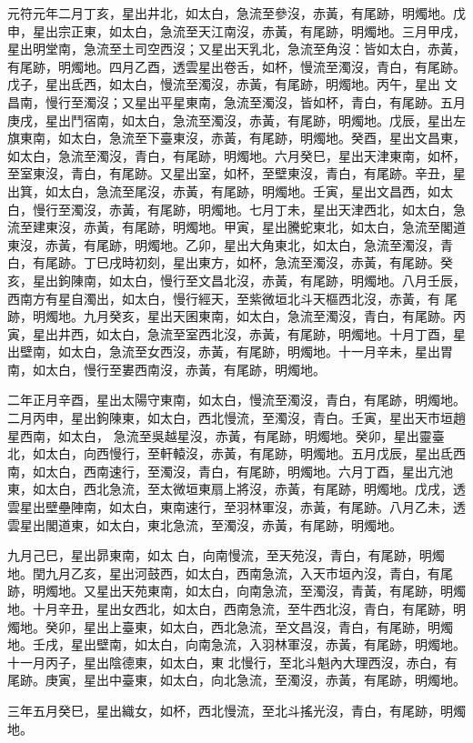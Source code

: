 \begin{pinyinscope}
 元符元年二月丁亥，星出井北，如太白，急流至參沒，赤黃，有尾跡，明燭地。戊申，星出宗正東，如太白，急流至天江南沒，赤黃，有尾跡，明燭地。三月甲戌，星出明堂南，急流至土司空西沒；又星出天乳北，急流至角沒：皆如太白，赤黃，有尾跡，明燭地。四月乙酉，透雲星出卷舌，如杯，慢流至濁沒，青白，有尾跡。戊子，星出氐西，如太白，慢流至濁沒，赤黃，有尾跡，明燭地。丙午，星出
 文昌南，慢行至濁沒；又星出平星東南，急流至濁沒，皆如杯，青白，有尾跡。五月庚戌，星出鬥宿南，如太白，急流至濁沒，赤黃，有尾跡，明燭地。戊辰，星出左旗東南，如太白，急流至下臺東沒，赤黃，有尾跡，明燭地。癸酉，星出文昌東，如太白，急流至濁沒，青白，有尾跡，明燭地。六月癸巳，星出天津東南，如杯，至室東沒，青白，有尾跡。又星出室，如杯，至壁東沒，青白，有尾跡。辛丑，星出箕，如太白，急流至尾沒，赤黃，有尾跡，明燭地。壬寅，星出文昌西，如太
 白，慢行至濁沒，赤黃，有尾跡，明燭地。七月丁未，星出天津西北，如太白，急流至建東沒，赤黃，有尾跡，明燭地。甲寅，星出騰蛇東北，如太白，急流至閣道東沒，赤黃，有尾跡，明燭地。乙卯，星出大角東北，如太白，急流至濁沒，青白，有尾跡。丁巳戌時初刻，星出東方，如杯，急流至濁沒，赤黃，有尾跡。癸亥，星出鉤陳南，如太白，慢行至文昌北沒，赤黃，有尾跡，明燭地。八月壬辰，西南方有星自濁出，如太白，慢行經天，至紫微垣北斗天樞西北沒，赤黃，有
 尾跡，明燭地。九月癸亥，星出天囷東南，如太白，急流至濁沒，青白，有尾跡。丙寅，星出井西，如太白，急流至室西北沒，赤黃，有尾跡，明燭地。十月丁酉，星出壁南，如太白，急流至女西沒，赤黃，有尾跡，明燭地。十一月辛未，星出胃南，如太白，慢行至婁西南沒，赤黃，有尾跡，明燭地。



 二年正月辛酉，星出太陽守東南，如太白，慢流至濁沒，青白，有尾跡，明燭地。二月丙申，星出鉤陳東，如太白，西北慢流，至濁沒，青白。壬寅，星出天市垣趙星西南，如太白，
 急流至吳越星沒，赤黃，有尾跡，明燭地。癸卯，星出靈臺北，如太白，向西慢行，至軒轅沒，赤黃，有尾跡，明燭地。五月戊辰，星出氐西南，如太白，西南速行，至濁沒，青白，有尾跡，明燭地。六月丁酉，星出亢池東，如太白，西北急流，至太微垣東扇上將沒，赤黃，有尾跡，明燭地。戊戌，透雲星出壁壘陣南，如太白，東南速行，至羽林軍沒，赤黃，有尾跡。八月乙未，透雲星出閣道東，如太白，東北急流，至濁沒，赤黃，有尾跡，明燭地。



 九月己巳，星出昴東南，如太
 白，向南慢流，至天苑沒，青白，有尾跡，明燭地。閏九月乙亥，星出河鼓西，如太白，西南急流，入天市垣內沒，青白，有尾跡，明燭地。又星出天苑東南，如太白，向南急流，至濁沒，青黃，有尾跡，明燭地。十月辛丑，星出女西北，如太白，西南急流，至牛西北沒，青白，有尾跡，明燭地。癸卯，星出上臺東，如太白，西北急流，至文昌沒，青白，有尾跡，明燭地。壬戌，星出壁南，如太白，向南急流，入羽林軍沒，赤黃，有尾跡，明燭地。十一月丙子，星出陰德東，如太白，東
 北慢行，至北斗魁內大理西沒，赤白，有尾跡。庚寅，星出中臺東，如太白，向北急流，至濁沒，赤黃，有尾跡，明燭地。



 三年五月癸巳，星出織女，如杯，西北慢流，至北斗搖光沒，青白，有尾跡，明燭地。



\end{pinyinscope}